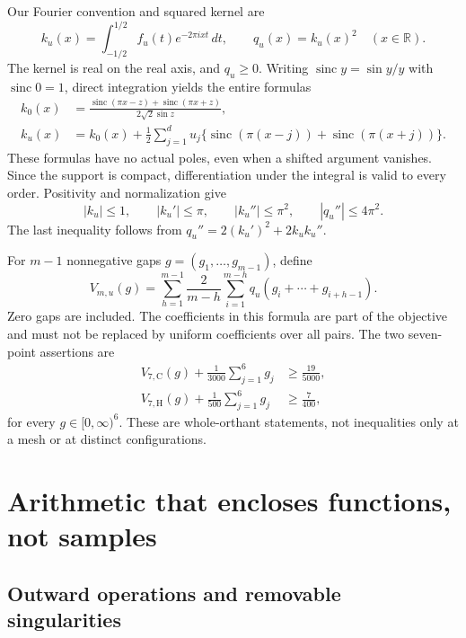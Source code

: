 \documentclass[11pt]{amsart}
\numberwithin{equation}{section}
\newcommand{\R}{\mathbb R}
\newcommand{\sinc}{\operatorname{sinc}}
\begin{document}
Our Fourier convention and squared kernel are
\begin{equation}\label{eq:kernel}
 k_u(x)=\int_{-1/2}^{1/2}f_u(t)e^{-2\pi ixt}\,dt,
 \qquad q_u(x)=k_u(x)^2\quad(x\in\R).
\end{equation}
The kernel is real on the real axis, and $q_u\geq0$. Writing
$\sinc y=\sin y/y$ with $\sinc0=1$, direct integration yields the entire
formulas
\begin{align}
 k_0(x)&=\frac{\sinc(\pi x-z)+\sinc(\pi x+z)}{2\sqrt2\sin z},
       \label{eq:sinc0}\\
 k_u(x)&=k_0(x)+\frac12\sum_{j=1}^d u_j
      \{\sinc(\pi(x-j))+\sinc(\pi(x+j))\}.\label{eq:sincu}
\end{align}
These formulas have no actual poles, even when a shifted argument
vanishes. Since the support is compact, differentiation under the
integral is valid to every order. Positivity and normalization give
\begin{equation}\label{eq:globalderivative}
 |k_u|\leq1,\qquad |k_u'|\leq\pi,\qquad |k_u''|\leq\pi^2,
 \qquad |q_u''|\leq4\pi^2.
\end{equation}
The last inequality follows from
$q_u''=2(k_u')^2+2k_uk_u''$.

For $m-1$ nonnegative gaps $g=(g_1,\ldots,g_{m-1})$, define
\begin{equation}\label{eq:Vm}
 V_{m,u}(g)=\sum_{h=1}^{m-1}\frac2{m-h}
       \sum_{i=1}^{m-h}q_u(g_i+\cdots+g_{i+h-1}).
\end{equation}
Zero gaps are included. The coefficients in this formula are part of
the objective and must not be replaced by uniform coefficients over
all pairs. The two seven-point assertions are
\begin{align}
 V_{7,\mathrm C}(g)+\frac1{3000}\sum_{j=1}^6g_j
       &\geq\frac{19}{5000},\label{eq:rowC}\\
 V_{7,\mathrm H}(g)+\frac1{500}\sum_{j=1}^6g_j
       &\geq\frac7{400},\label{eq:rowH}
\end{align}
for every $g\in[0,\infty)^6$. These are whole-orthant statements, not
inequalities only at a mesh or at distinct configurations.

\section{Arithmetic that encloses functions, not samples}

\subsection{Outward operations and removable singularities}
\end{document}
